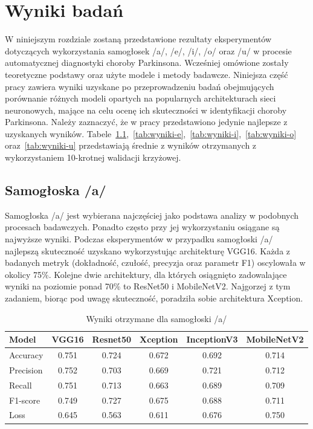 \chapter{Wyniki badań\@}
\label{ch:wyniki}

W niniejszym rozdziale zostaną przedstawione rezultaty eksperymentów dotyczących wykorzystania samogłosek /a/, /e/, /i/, /o/ oraz /u/ w procesie automatycznej diagnostyki choroby Parkinsona.
Wcześniej omówione zostały teoretyczne podstawy oraz użyte modele i metody badawcze.
Niniejsza część pracy zawiera wyniki uzyskane po przeprowadzeniu badań obejmujących porównanie różnych modeli opartych na popularnych architekturach sieci neuronowych, mające na celu ocenę ich skuteczności w identyfikacji choroby Parkinsona.
Należy zaznaczyć, że w pracy przedstawiono jedynie najlepsze z uzyskanych wyników.
Tabele~\ref{tab:wyniki-a},~\ref{tab:wyniki-e},~\ref{tab:wyniki-i},~\ref{tab:wyniki-o} oraz~\ref{tab:wyniki-u} przedstawiają średnie z wyników otrzymanych z wykorzystaniem 10-krotnej walidacji krzyżowej.


\section{Samogłoska /a/}
\label{sec:samogloska-a}

Samogłoska /a/ jest wybierana najczęściej jako podstawa analizy w podobnych procesach badawczych.
Ponadto często przy jej wykorzystaniu osiągane są najwyższe wyniki.
Podczas eksperymentów w przypadku samogłoski /a/ najlepszą skuteczność uzyskano wykorzystując architekturę VGG16.
Każda z badanych metryk (dokładność, czułość, precyzja oraz parametr F1) oscylowała w okolicy 75\%.
Kolejne dwie architektury, dla których osiągnięto zadowalające wyniki na poziomie ponad 70\% to ResNet50 i MobileNetV2.
Najgorzej z tym zadaniem, biorąc pod uwagę skuteczność, poradziła sobie architektura Xception.

\begin{table}[ht]
\centering
\caption{Wyniki otrzymane dla samogłoski /a/}
\label{tab:wyniki-a}
\begin{tabular}{|l|c|c|c|c|c|}
\hline
\textbf{Model} &\textbf{VGG16} &\textbf{Resnet50} &\textbf{Xception} &\textbf{InceptionV3} &\textbf{MobileNetV2} \\ \hline
    Accuracy &0.751 &0.724 &0.672 &0.692 &0.714 \\ \hline
    Precision &0.752 &0.703 &0.669 &0.721 &0.712 \\ \hline
    Recall &0.751 &0.713 &0.663 &0.689 &0.709 \\ \hline
    F1-score &0.749 &0.727 &0.675 &0.688 &0.711 \\ \hline
    Loss &0.645 &0.563 &0.611 &0.676 &0.750 \\ \hline
\end{tabular}
\end{table}

